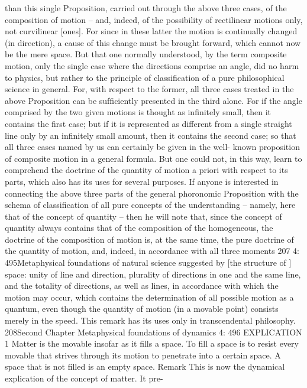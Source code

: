 than this single Proposition, carried out through the above three cases, of
the composition of motion – and, indeed, of the possibility of rectilinear
motions only, not curvilinear [ones]. For since in these latter the motion is
continually changed (in direction), a cause of this change must be brought
forward, which cannot now be the mere space. But that one normally
understood, by the term composite motion, only the single case where the
directions comprise an angle, did no harm to physics, but rather to the
principle of classiﬁcation of a pure philosophical science in general. For,
with respect to the former, all three cases treated in the above Proposition
can be sufﬁciently presented in the third alone. For if the angle comprised
by the two given motions is thought as inﬁnitely small, then it contains
the ﬁrst case; but if it is represented as different from a single straight
line only by an inﬁnitely small amount, then it contains the second case;
so that all three cases named by us can certainly be given in the well-
known proposition of composite motion in a general formula. But one
could not, in this way, learn to comprehend the doctrine of the quantity
of motion a priori with respect to its parts, which also has its uses for
several purposes.
If anyone is interested in connecting the above three parts of the
general phoronomic Proposition with the schema of classiﬁcation of all
pure concepts of the understanding – namely, here that of the concept
of quantity – then he will note that, since the concept of quantity always
contains that of the composition of the homogeneous, the doctrine of
the composition of motion is, at the same time, the pure doctrine of the
quantity of motion, and, indeed, in accordance with all three moments
207
4: 495Metaphysical foundations of natural science
suggested by [the structure of ] space: unity of line and direction, plurality
of directions in one and the same line, and the totality of directions, as
well as lines, in accordance with which the motion may occur, which
contains the determination of all possible motion as a quantum, even
though the quantity of motion (in a movable point) consists merely in
the speed. This remark has its uses only in transcendental philosophy.
208Second Chapter
Metaphysical foundations of dynamics
4: 496
EXPLICATION 1
Matter is the movable insofar as it ﬁlls a space. To ﬁll a space is to resist
every movable that strives through its motion to penetrate into a certain
space. A space that is not ﬁlled is an empty space.
Remark
This is now the dynamical explication of the concept of matter. It pre-
